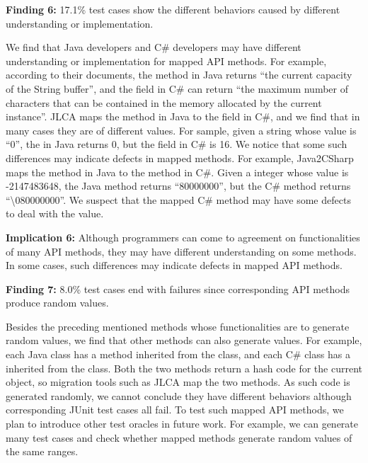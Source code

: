 \textbf{Finding 6:} 17.1\% test cases show the different behaviors caused by different understanding or implementation.

We find that Java developers and C\# developers may have different understanding or implementation for mapped API methods. For example, according to their documents, the  method in Java returns ``the current capacity of the String buffer'', and the  field in C\# can return ``the maximum number of characters that can be contained in the memory allocated by the current instance''. JLCA maps the method in Java to the field in C\#, and we find that in many cases they are of different values. For sample, given a string whose value is ``0'', the  in Java returns 0, but the  field in C\# is 16. We notice that some such differences may indicate defects in mapped methods. For example, Java2CSharp maps the  method in Java to the  method in C\#. Given a integer whose value is -2147483648, the Java method returns ``80000000'', but the C\# method returns ``\textbackslash080000000''. We suspect that the mapped C\# method may have some defects to deal with the value.

\textbf{Implication 6:} Although programmers can come to agreement on functionalities of many API methods, they may have different understanding on some methods. In some cases, such differences may indicate defects in mapped API methods.

\textbf{Finding 7:} 8.0\% test cases end with failures since corresponding API methods produce random values.

Besides the preceding mentioned methods whose functionalities are to generate random values, we find that other methods can also generate values. For example, each Java class has a  method inherited from the  class, and each C\# class has a  inherited from the  class. Both the two methods return a hash code for the current object, so migration tools such as JLCA map the two methods. As such code is generated randomly, we cannot conclude they have different behaviors although corresponding JUnit test cases all fail. To test such mapped API methods, we plan to introduce other test oracles in future work. For example, we can generate many test cases and check whether mapped methods generate random values of the same ranges.


